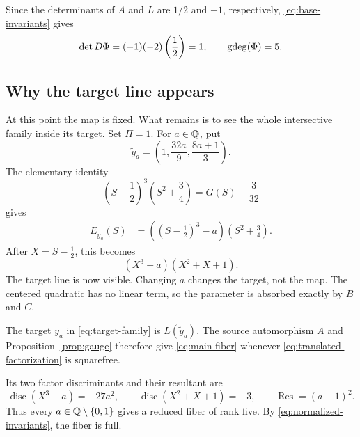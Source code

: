 Since the determinants of \(A\) and \(L\) are \(1/2\) and \(-1\),
respectively, \eqref{eq:base-invariants} gives
\begin{equation}
 \det D\Phi=(-1)(-2)\left(\frac12\right)=1,
 \qquad
 \operatorname{gdeg}(\Phi)=5.\label{eq:normalized-invariants}
\end{equation}

\subsection{Why the target line appears}

At this point the map is fixed.  What remains is to see the whole
intersective family inside its target.  Set \(\Pi=1\).  For \(a\in\mathbb Q\), put
\begin{equation}
 \widetilde y_a=
 \left(1,\frac{32a}{9},\frac{8a+1}{3}\right).\label{eq:unnormalized-target}
\end{equation}
The elementary identity
\begin{equation}
 \left(S-\frac12\right)^3\left(S^2+\frac34\right)
 =G(S)-\frac3{32}\label{eq:centered-identity}
\end{equation}
gives
\begin{align}
 E_{\widetilde y_a}(S)
 &=
 \left(\left(S-\frac12\right)^3-a\right)
 \left(S^2+\frac34\right).\label{eq:target-factorization}
\end{align}
After \(X=S-\tfrac12\), this becomes
\begin{equation}
 (X^3-a)(X^2+X+1).\label{eq:translated-factorization}
\end{equation}
The target line is now visible.  Changing \(a\) changes the target, not the
map.  The centered quadratic has no linear term, so the parameter is
absorbed exactly by \(B\) and \(C\).

The target \(y_a\) in \eqref{eq:target-family} is \(L(\widetilde y_a)\).  The source
automorphism \(A\) and Proposition~\ref{prop:gauge} therefore give
\eqref{eq:main-fiber} whenever \eqref{eq:translated-factorization} is squarefree.

Its two factor discriminants and their resultant are
\begin{equation}
 \operatorname{disc}(X^3-a)=-27a^2,\qquad
 \operatorname{disc}(X^2+X+1)=-3,\qquad
 \operatorname{Res}=(a-1)^2.\label{eq:disc-resultant}
\end{equation}
Thus every \(a\in\mathbb Q\setminus\{0,1\}\) gives a reduced fiber of rank five.
By \eqref{eq:normalized-invariants}, the fiber is full.
